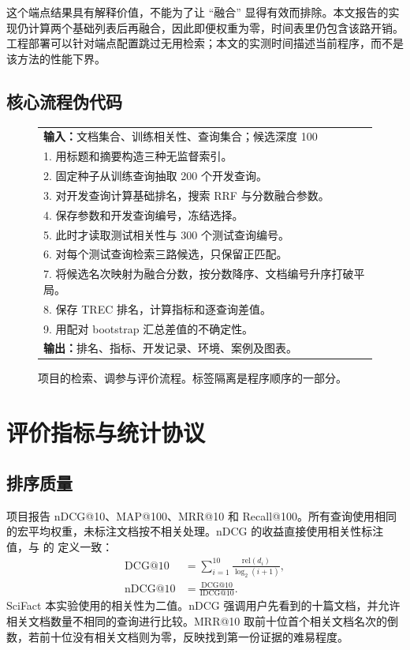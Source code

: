 \documentclass[sigconf,nonacm]{acmart}
\begin{document}
这个端点结果具有解释价值，不能为了让 ``融合'' 显得有效而排除。本文报告的实现仍计算两个基础列表后再融合，因此即便权重为零，时间表里仍包含该路开销。工程部署可以针对端点配置跳过无用检索；本文的实测时间描述当前程序，而不是该方法的性能下界。

\subsection{核心流程伪代码}
\begin{figure}[t]
\small
\begin{tabular}{p{}}
\toprule
\textbf{输入：}文档集合、训练相关性、查询集合；候选深度 100\\
1. 用标题和摘要构造三种无监督索引。\\
2. 固定种子从训练查询抽取 200 个开发查询。\\
3. 对开发查询计算基础排名，搜索 RRF 与分数融合参数。\\
4. 保存参数和开发查询编号，冻结选择。\\
5. 此时才读取测试相关性与 300 个测试查询编号。\\
6. 对每个测试查询检索三路候选，只保留正匹配。\\
7. 将候选名次映射为融合分数，按分数降序、文档编号升序打破平局。\\
8. 保存 TREC 排名，计算指标和逐查询差值。\\
9. 用配对 bootstrap 汇总差值的不确定性。\\
\textbf{输出：}排名、指标、开发记录、环境、案例及图表。\\
\bottomrule
\end{tabular}
\caption{项目的检索、调参与评价流程。标签隔离是程序顺序的一部分。}
\label{fig:workflow}
\end{figure}

\section{评价指标与统计协议}
\subsection{排序质量}
项目报告 nDCG@10、MAP@100、MRR@10 和 Recall@100。所有查询使用相同的宏平均权重，未标注文档按不相关处理。nDCG 的收益直接使用相关性标注值，与  的  定义一致：
\begin{equation}
\begin{aligned}
\mathrm{DCG}@10&=\sum_{i=1}^{10}\frac{\mathrm{rel}(d_i)}{\log_2(i+1)},\\
\mathrm{nDCG}@10&=\frac{\mathrm{DCG}@10}{\mathrm{IDCG}@10}.
\end{aligned}
\end{equation}
SciFact 本实验使用的相关性为二值。nDCG 强调用户先看到的十篇文档，并允许相关文档数量不相同的查询进行比较。MRR@10 取前十位首个相关文档名次的倒数，若前十位没有相关文档则为零，反映找到第一份证据的难易程度。
\end{document}
